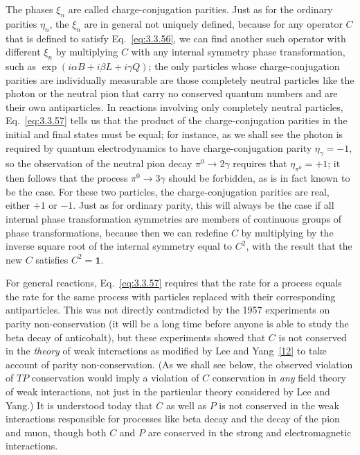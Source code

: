 The phases $\xi_n$ are called charge-conjugation parities. Just as for the ordinary
parities $\eta_n$, the $\xi_n$ are in general not uniquely defined, because for any
operator $C$ that is defined to satisfy Eq.~\eqref{eq:3.3.56}, we can find another such
operator with different $\xi_n$ by multiplying $C$ with any internal symmetry
phase transformation, such as $\exp(i\alpha B+i\beta L+i\gamma Q)$; the only
particles whose charge-conjugation parities are individually measurable are those
completely neutral particles like the photon or the neutral pion that carry no
conserved quantum numbers and are their own antiparticles. In reactions involving
only completely neutral particles, Eq.~\eqref{eq:3.3.57} tells us that the product of the
charge-conjugation parities in the initial and final states must be equal; for
instance, as we shall see the photon is required by quantum electrodynamics to have
charge-conjugation parity $\eta_\gamma=-1$, so the observation of the neutral pion
decay $\pi^0\to2\gamma$ requires that $\eta_{\pi^0}=+1$; it then follows that the
process $\pi^0\to3\gamma$ should be forbidden, as is in fact known to be the case.
For these two particles, the charge-conjugation parities are real, either $+1$ or
$-1$. Just as for ordinary parity, this will always be the case if all internal
phase transformation symmetries are members of continuous groups of phase
transformations, because then we can redefine $C$ by multiplying by the inverse
square root of the internal symmetry equal to $C^2$, with the result that the new
$C$ satisfies $C^2=\mathbf{1}$.

For general reactions, Eq.~\eqref{eq:3.3.57} requires that the rate for a process equals the
rate for the same process with particles replaced with their corresponding
antiparticles. This was not directly contradicted by the 1957 experiments on parity
non-conservation (it will be a long time before anyone is able to study the beta
decay of anticobalt), but these experiments showed that $C$ is not conserved in the
\textit{theory} of weak interactions as modified by Lee and Yang~\hyperref[ref:3.12]{[12]} to take
account of parity non-conservation. (As we shall see below, the observed violation
of $TP$ conservation would imply a violation of $C$ conservation in \textit{any}
field theory of weak interactions, not just in the particular theory considered by
Lee and Yang.) It is understood today that $C$ as well as $P$ is not conserved in
the weak interactions responsible for processes like beta decay and the decay of
the pion and muon, though both $C$ and $P$ are conserved in the strong and
electromagnetic interactions.

